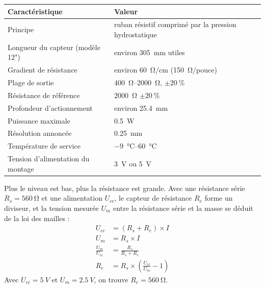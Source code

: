 \noindent
\begin{table}[H]
\centering
\begin{tabularx}{\linewidth}{lY}
\hline
Caractéristique & Valeur \\
\hline
Principe & ruban résistif comprimé par la pression hydrostatique \\
Longueur du capteur (modèle 12") & environ \qty{305}{mm} utiles \\
Gradient de résistance & environ \qty{60}{\ohm/cm} (\qty{150}{\ohm}/pouce) \\
Plage de sortie & \qtyrange{400}{2000}{\ohm}, $\pm\qty{20}{\percent}$ \\
Résistance de référence & \qty{2000}{\ohm} $\pm\qty{20}{\percent}$ \\
Profondeur d'actionnement & environ \qty{25,4}{mm} \\
Puissance maximale & \qty{0,5}{W} \\
Résolution annoncée & \qty{0,25}{mm} \\
Température de service & \qtyrange{-9}{60}{\celsius} \\
Tension d'alimentation du montage & \qty{3}{V} ou \qty{5}{V} \\
\hline
\end{tabularx}
\end{table}
Plus le niveau est bas, plus la résistance est grande. Avec une résistance série $R_s = \qty{560}{\ohm}$ et une alimentation $U_{cc}$, le capteur de résistance $R_e$ forme un diviseur, et la tension mesurée $U_m$ entre la résistance série et la masse se déduit de la loi des mailles :
\begin{align*}
U_{cc} &= (R_s + R_e) \times I\\
U_m &= R_s \times I\\
\frac{U_m}{U_{cc}} &= \frac{R_s}{R_s + R_e}\\
R_e &= R_s \times \left(\frac{U_{cc}}{U_m} - 1\right)
\end{align*}
Avec $U_{cc} = \qty{5}{V}$ et $U_m = \qty{2,5}{V}$, on trouve $R_e = \qty{560}{\ohm}$.

